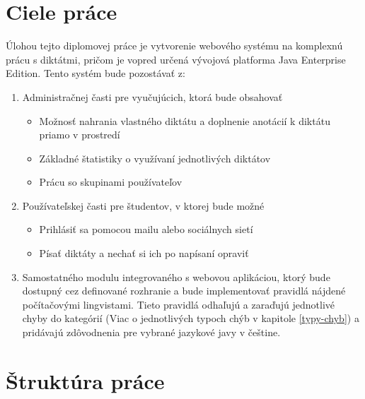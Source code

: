 \documentclass[12pt,oneside]{fithesis2}
\begin{document}
    \section{Ciele práce}
    Úlohou tejto diplomovej práce je vytvorenie webového systému na komplexnú prácu s diktátmi, pričom je vopred určená vývojová platforma Java Enterprise Edition. Tento systém bude pozostávať z:

\begin{enumerate}
\item Administračnej časti pre vyučujúcich, ktorá bude obsahovať
	\begin{itemize}
	\item Možnosť nahrania vlastného diktátu a doplnenie anotácií k diktátu priamo v prostredí
	\item Základné štatistiky o využívaní jednotlivých diktátov
	\item Prácu so skupinami používateľov
	\end{itemize}
\item Používateľskej časti pre študentov, v ktorej bude možné
	\begin{itemize}
	\item Prihlásiť sa pomocou mailu alebo sociálnych sietí
	\item Písať diktáty a nechať si ich po napísaní opraviť
	\end{itemize}
\item Samostatného modulu integrovaného s webovou aplikáciou, ktorý bude dostupný cez definované rozhranie a bude implementovať pravidlá nájdené počítačovými lingvistami. Tieto pravidlá odhaľujú a zaraďujú jednotlivé chyby do kategórií (Viac o jednotlivých typoch chýb v kapitole \ref{typy-chyb}) a pridávajú zdôvodnenia pre vybrané jazykové javy v češtine.
\end{enumerate}
\pagebreak
    \section{Štruktúra práce}
    
\end{document}
